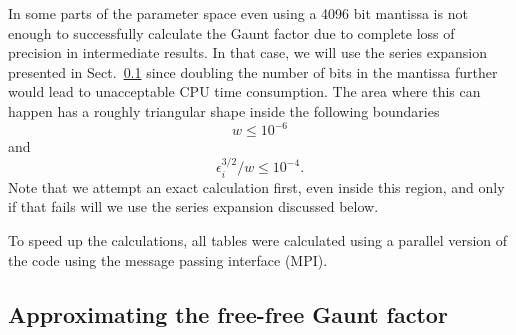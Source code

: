 \documentclass[useAMS,usenatbib]{mn2e}
\begin{document}
In some parts of the parameter space even using a 4096 bit mantissa is not
enough to successfully calculate the Gaunt factor due to complete loss of
precision in intermediate results. In that case, we will use the series
expansion presented in Sect.~\ref{approx} since doubling the number of bits in
the mantissa further would lead to unacceptable CPU time consumption. The area
where this can happen has a roughly triangular shape inside the following
boundaries
\begin{equation}
w \leq 10^{-6}
\label{bound1}
\end{equation}
and
\begin{equation}
\epsilon_i^{3/2}/w \leq 10^{-4}.
\label{bound2}
\end{equation}
Note that we attempt an exact calculation first, even inside this region,
and only if that fails will we use the series expansion discussed below.

To speed up the calculations, all tables were calculated using a parallel
version of the code using the message passing interface (MPI).

\subsection{Approximating the free-free Gaunt factor}
\label{approx}
\end{document}
